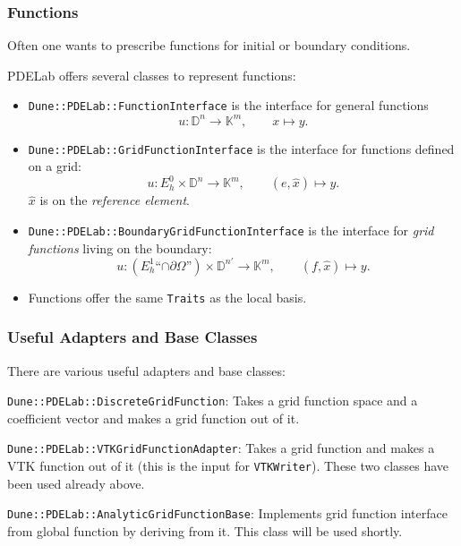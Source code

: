 
\begin{frame}
\frametitle<presentation>{Functions}
Often one wants to prescribe functions for initial or boundary
conditions.

PDELab offers several classes to represent functions:
\begin{itemize}
\item \lstinline{Dune::PDELab::FunctionInterface} is the interface for general
functions $$u : \mathbb{D}^n \to \mathbb{K}^m, \qquad x \mapsto y.$$ 
\item \lstinline{Dune::PDELab::GridFunctionInterface} is the interface
for functions defined on a grid:
$$u : E_h^0 \times \mathbb{D}^n \to \mathbb{K}^m, \qquad
(e,\hat{x}) \mapsto y.$$
$\hat{x}$ is on the \textit{reference element}.
\item \lstinline{Dune::PDELab::BoundaryGridFunctionInterface} is the
interface for \textit{grid functions} living on the boundary:
$$u : (E_h^1\text{``$\cap\partial\Omega$''}) \times \mathbb{D}^{n'} \to \mathbb{K}^m, \qquad
(f,\hat{x}) \mapsto y.$$
\item Functions offer the same \lstinline{Traits} as the local basis.
\end{itemize}
\end{frame}


\begin{frame}
\frametitle<presentation>{Useful Adapters and Base Classes}
There are various useful adapters and base classes:

\lstinline{Dune::PDELab::DiscreteGridFunction}: Takes a grid
function space and a coefficient vector and makes a grid function out
of it.

\lstinline{Dune::PDELab::VTKGridFunctionAdapter}: Takes a grid
function and makes a VTK function out of it (this is the input
for \lstinline{VTKWriter}). These two classes have been used already above.

\lstinline{Dune::PDELab::AnalyticGridFunctionBase}: Implements
grid function interface from global function by deriving from it.
This class will be used shortly.

\end{frame}

